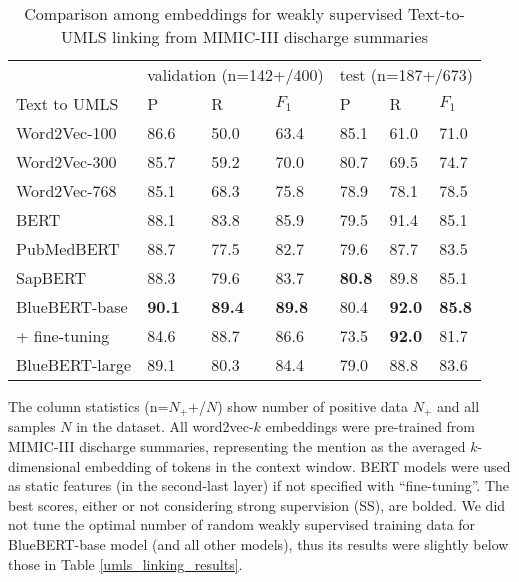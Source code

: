 \documentclass[twocolumn]{bmcart}
\begin{document}
\begin{table}[t]
\caption{Comparison among embeddings for weakly supervised Text-to-UMLS linking from MIMIC-III discharge summaries}
\scriptsize
\center
\label{umls_linking_embedding_results}
\begin{threeparttable}
\begin{tabular}{llll|lll}
\cline{1-7}
                            & \multicolumn{3}{l}{validation (n=142+/400)}         & \multicolumn{3}{l}{test (n=187+/673)}               \\
Text to UMLS      & P             & R              & $F_1$         & P             & R              & $F_1$       \\
\cline{1-7}
Word2Vec-100                     & 86.6          & 50.0           & 63.4          & 85.1          & 61.0           & 71.0\\
Word2Vec-300                     & 85.7          & 59.2           & 70.0          & 80.7          & 69.5           & 74.7\\
Word2Vec-768                     & 85.1          & 68.3           & 75.8          & 78.9          & 78.1           & 78.5\\
\cline{1-7}
BERT    & 88.1          & 83.8           & 85.9          & 79.5         & 91.4           & 85.1            \\
PubMedBERT & 88.7          & 77.5           & 82.7          & 79.6          & 87.7           & 83.5            \\
SapBERT & 88.3          & 79.6 & 83.7          & \textbf{80.8}          & 89.8 & 85.1         \\
BlueBERT-base & \textbf{90.1}          & \textbf{89.4}           & \textbf{89.8}          & 80.4          & \textbf{92.0}           & \textbf{85.8}                   \\
+ fine-tuning & 84.6          & 88.7           & 86.6          & 73.5          & \textbf{92.0}           & 81.7                   \\
BlueBERT-large & 89.1          & 80.3           & 84.4          & 79.0          & 88.8           & 83.6                   \\
\cline{1-7}
\end{tabular}
\begin{tablenotes}
\item The column statistics (n=$N_+$+/$N$) show number of positive data $N_+$ and all samples $N$ in the dataset. All word2vec-$k$ embeddings were pre-trained from MIMIC-III discharge summaries, representing the mention as the averaged $k$-dimensional embedding of tokens in the context window. BERT models were used as static features (in the second-last layer) if not specified with ``fine-tuning''. The best scores, either or not considering strong supervision (SS), are bolded. We did not tune the optimal number of random weakly supervised training data for BlueBERT-base model (and all other models), thus its results were slightly below those in Table \ref{umls_linking_results}.
\end{tablenotes}
\end{threeparttable}
\end{table}
\end{document}
